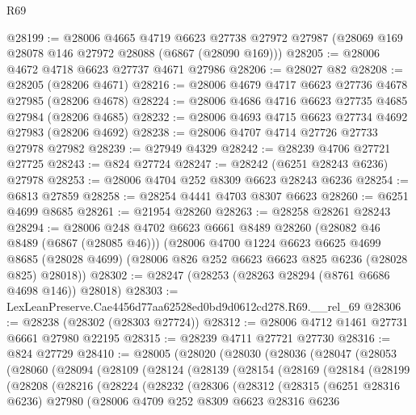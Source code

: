 \begin{lexlean}{R69}
\begin{coremodule}
{@28199 := @28006
    @4665
    @4719
    @6623
    @27738
    @27972
    @27987
    (@28069 @169 @28078 @146 @27972 @28088 (@6867 (@28090 @169)))
@28205 := @28006 @4672 @4718 @6623 @27737 @4671 @27986
@28206 := @28027 @82
@28208 := @28205 (@28206 @4671)
@28216 := @28006 @4679 @4717 @6623 @27736 @4678 @27985 (@28206 @4678)
@28224 := @28006 @4686 @4716 @6623 @27735 @4685 @27984 (@28206 @4685)
@28232 := @28006 @4693 @4715 @6623 @27734 @4692 @27983 (@28206 @4692)
@28238 := @28006 @4707 @4714 @27726 @27733 @27978 @27982
@28239 := @27949 @4329
@28242 := @28239 @4706 @27721 @27725
@28243 := @824 @27724
@28247 := @28242 (@6251 @28243 @6236) @27978
@28253 := @28006 @4704 @252 @8309 @6623 @28243 @6236
@28254 := @6813 @27859
@28258 := @28254 @4441 @4703 @8307 @6623
@28260 := @6251 @4699 @8685
@28261 := @21954 @28260
@28263 := @28258 @28261 @28243
@28294 := @28006
    @248
    @4702
    @6623
    @6661
    @8489
    @28260
    (@28082 @46 @8489 (@6867 (@28085 @46)))
    (@28006
      @4700
      @1224
      @6623
      @6625
      @4699
      @8685
      (@28028 @4699)
      (@28006 @826 @252 @6623 @6623 @825 @6236 (@28028 @825) @28018))
@28302 := @28247 (@28253 (@28263 @28294 (@8761 @6686 @4698 @146)) @28018)
@28303 := LexLeanPreserve.Cae4456d77aa62528ed0bd9d0612cd278.R69.__rel_69
@28306 := @28238 (@28302 (@28303 @27724))
@28312 := @28006 @4712 @1461 @27731 @6661 @27980 @22195
@28315 := @28239 @4711 @27721 @27730
@28316 := @824 @27729
@28410 := @28005
    (@28020
      (@28030
        (@28036
          (@28047
            (@28053
              (@28060
                (@28094
                  (@28109
                    (@28124
                      (@28139
                        (@28154
                          (@28169
                            (@28184
                              (@28199
                                (@28208
                                  (@28216
                                    (@28224
                                      (@28232
                                        (@28306
                                          (@28312
                                            (@28315
                                              (@6251 @28316 @6236)
                                              @27980
                                              (@28006
                                                @4709
                                                @252
                                                @8309
                                                @6623
                                                @28316
                                                @6236
}
\end{coremodule}
\end{lexlean}
